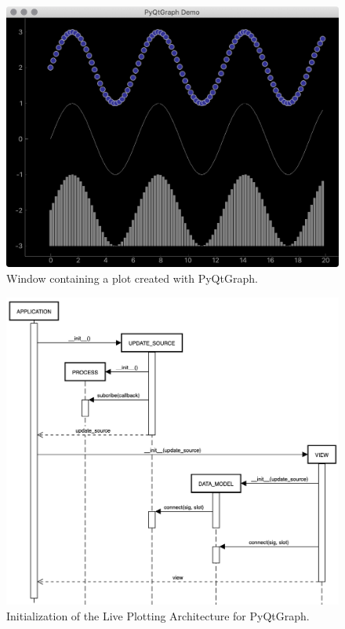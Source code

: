 \begin{figure}[h]
    \centering
    \includegraphics[width=14cm]{resources/img/PyQtGraphDemo}
    \caption{Window containing a plot created with PyQtGraph.}
    \label{a:fig:pyqtgraph:window}
\end{figure}


\begin{figure}[h]
    \centering
    \includegraphics[width=14cm]{resources/img/sequence/updateSourceInit}
    \caption{Initialization of the Live Plotting Architecture for PyQtGraph.}
    \label{a:fig:pyqtgraph:updatesource:init} 
\end{figure}



